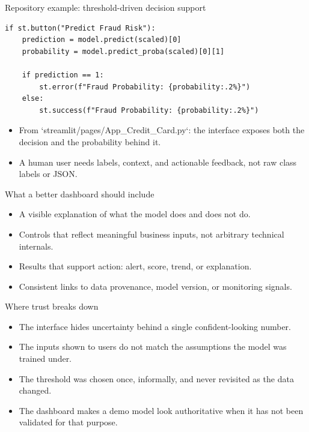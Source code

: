 \begin{frame}[fragile]{Repository example: threshold-driven decision support}
\begin{lstlisting}[style=coursepython]
if st.button("Predict Fraud Risk"):
    prediction = model.predict(scaled)[0]
    probability = model.predict_proba(scaled)[0][1]

    if prediction == 1:
        st.error(f"Fraud Probability: {probability:.2%}")
    else:
        st.success(f"Fraud Probability: {probability:.2%}")
\end{lstlisting}
\begin{itemize}
\item From `streamlit/pages/App_Credit_Card.py`: the interface exposes both the decision and the probability behind it.
\item A human user needs labels, context, and actionable feedback, not raw class labels or JSON.
\end{itemize}
\coursefooter
\end{frame}

\begin{frame}{What a better dashboard should include}
\begin{itemize}
\item A visible explanation of what the model does and does not do.
\item Controls that reflect meaningful business inputs, not arbitrary technical internals.
\item Results that support action: alert, score, trend, or explanation.
\item Consistent links to data provenance, model version, or monitoring signals.
\end{itemize}
\coursefooter
\end{frame}

\begin{frame}{Where trust breaks down}
\begin{itemize}
\item The interface hides uncertainty behind a single confident-looking number.
\item The inputs shown to users do not match the assumptions the model was trained under.
\item The threshold was chosen once, informally, and never revisited as the data changed.
\item The dashboard makes a demo model look authoritative when it has not been validated for that purpose.
\end{itemize}
\coursefooter
\end{frame}

